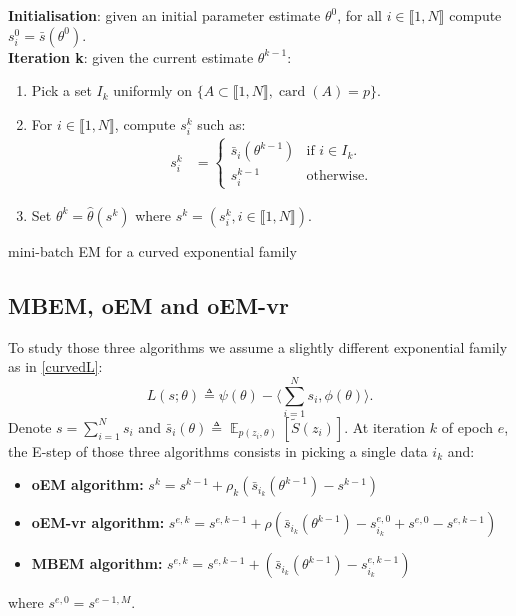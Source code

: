 \documentclass[11pt]{article}
\theoremstyle{plain}
\newcommand{\inter}{\llbracket1,N\rrbracket}
\DeclareMathOperator*{\E}{\mathbb{E}}
\theoremstyle{plain}
\theoremstyle{definition}
\begin{document}
\begin{algorithm}[H]
\textbf{Initialisation}: given an initial parameter estimate $\theta^0$, for all $i \in \inter$ compute $s^0_i = \bar{s}(\theta^0)$.\\
\textbf{Iteration k}: given the current estimate $\theta^{k-1}$:
\begin{enumerate}
\item Pick a set $I_k$ uniformly on $\{A \subset \inter, \operatorname{card}(A)=p\}$.
\item For $i \in \inter$, compute $s^k_{i}$ such as:
\begin{align}
 s^k_i &=
  \begin{cases}
   \bar{s}_i(\theta^{k-1})    & \text{if } i \in I_k.\\
   s^{k-1}_i                               & \text{otherwise}.
  \end{cases}
\end{align}

\item Set $\theta^{k} = \hat{\theta}(s^k)$ where $s^k = (s^k_i, i \in \inter)$.

\end{enumerate}
\caption{mini-batch EM for a curved exponential family}
\label{alg:mbem-expo}
\end{algorithm}

\subsection{MBEM, oEM and oEM-vr}
To study those three algorithms we assume a slightly different exponential family as in \eqref{curvedL}:
\begin{equation}\label{curvedL}
L(s;\theta) \triangleq \psi(\theta) - \langle \sum_{i=1}^N{s_i}, \phi(\theta)\rangle.
\end{equation}
Denote $s = \sum_{i=1}^N{s_i}$ and $\bar{s}_i(\theta) \triangleq \E_{p(z_i, \theta)}[\tilde{S}(z_i)]$. At iteration $k$ of epoch $e$, the E-step of those three algorithms consists in picking a single data $i_k$ and:
\begin{itemize}
\item \textbf{oEM algorithm:}  $s^{k} = s^{k-1} + \rho_k ( \bar{s}_{i_k}(\theta^{k-1})  - s^{k-1} )$
\item \textbf{oEM-vr algorithm: }  $s^{e,k} = s^{e,k-1} + \rho ( \bar{s}_{i_k}(\theta^{k-1}) - s_{i_k}^{e,0}+ s^{e,0} - s^{e,k-1} )$
\item \textbf{MBEM algorithm: }  $s^{e,k} = s^{e,k-1} +  ( \bar{s}_{i_k}(\theta^{k-1})  - s_{i_k}^{e,k-1} )$
\end{itemize}
where $ s^{e,0}  = s^{e-1,M}$.
\end{document}
